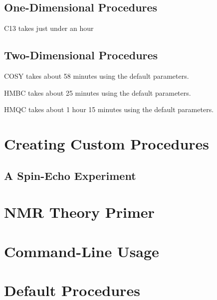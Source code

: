 \documentclass[12pt, openany, letterpaper]{memoir}
\begin{document}
\section{One-Dimensional Procedures}
C13 takes just under an hour

\section{Two-Dimensional Procedures}
COSY takes about 58 minutes using the default parameters.

HMBC takes about 25 minutes using the default parameters.

HMQC takes about 1 hour 15 minutes using the default parameters.

\chapter{Creating Custom Procedures}
\label{CH:Custom}

\section{A Spin-Echo Experiment}

\chapter{NMR Theory Primer}
\label{CH:Theory}

\appendix
{}
\chapter{Command-Line Usage}
\label{CH:Commands}

\chapter{Default Procedures}
\label{CH:Procedures}
\end{document}
